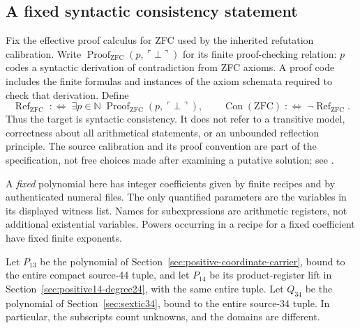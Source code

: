 \documentclass[11pt,a4paper]{article}
\theoremstyle{definition}
\newcommand{\N}{\mathbb N}
\newcommand{\ZFC}{\mathrm{ZFC}}
\newcommand{\Con}{\operatorname{Con}}
\newcommand{\ZFCRef}{\operatorname{Ref}}
\newcommand{\Proof}{\operatorname{Proof}}
\begin{document}
\subsection{A fixed syntactic consistency statement}

Fix the effective proof calculus for ZFC used by the inherited refutation
calibration.  Write
\(\Proof_{\ZFC}(p,\ulcorner\bot\urcorner)\) for its finite proof-checking
relation: \(p\) codes a syntactic derivation of contradiction from ZFC
axioms.  A proof code includes the finite formulas and instances of the
axiom schemata required to check that derivation.  Define
\begin{equation}
 \ZFCRef_{\ZFC}\;:\!\Longleftrightarrow\;
 \exists p\in\N\;\Proof_{\ZFC}(p,\ulcorner\bot\urcorner),
 \qquad
 \Con(\ZFC)\;:\!\Longleftrightarrow\;\neg\ZFCRef_{\ZFC}.
 \label{eq:syntactic-con}
\end{equation}
Thus the target is syntactic consistency.  It does not refer to a
transitive model, correctness about all arithmetical statements, or an
unbounded reflection principle.  The source calibration and its proof
convention are part of the specification, not free choices made after
examining a putative solution; see
\cite{fixed-source,native-calibration,object-zfc}.

A \emph{fixed} polynomial here has integer coefficients given by finite
recipes and by authenticated numeral files.  The only quantified
parameters are the variables in its displayed witness list.  Names for
subexpressions are arithmetic registers, not additional existential
variables.  Powers occurring in a recipe for a fixed coefficient have
fixed finite exponents.

Let \(P_{13}\) be the polynomial of
Section~\ref{sec:positive-coordinate-carrier}, bound to the entire compact
source-44 tuple, and let \(P_{14}\) be its product-register lift in
Section~\ref{sec:positive14-degree24}, with the same entire tuple.
Let \(Q_{34}\) be the polynomial of
Section~\ref{sec:sextic34}, bound to the entire source-34 tuple.  In
particular, the subscripts count unknowns, and the domains are different.
\end{document}
